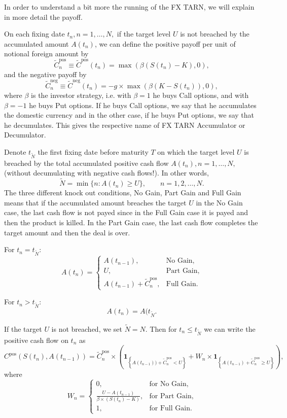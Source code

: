In order to understand a bit more the running of the FX TARN, we will explain in more detail the payoff. 

On each fixing date $t_n, n = 1,\ldots,N,$ if the target level $U$ is not breached by the accumulated amount $A(t_n)$, we can define the positive payoff per unit of notional foreign amount by
$$\tilde{C}^\text{pos}_n \equiv \tilde{C}^\text{pos}(t_n) = \max(\beta(S(t_n)-K),0), $$
and the negative payoff by
$$\tilde{C}_n^\text{neg}\equiv \tilde{C}^\text{neg}(t_n) = -g \times \max(\beta(K-S(t_n)),0),$$
where $\beta$ is the investor strategy, i.e. with $\beta = 1$ he buys Call options, and with $\beta = -1$ he buys Put options. If he buys Call options, we say that he accumulates the domestic currency and in the other case, if he buys Put options, we say that he decumulates. This gives the respective name of FX TARN Accumulator or Decumulator.

Denote $t_{\tilde{N}}$ the first fixing date before maturity $T$ on which the target level $U$ is breached by the total accumulated positive cash flow $A(t_n), n = 1,\ldots,N,$ (without decumulating with negative cash flows!). In other words,
\[\tilde{N}=\min\{n: A(t_n)\geq U\},\qquad n = 1,2,\ldots,N.\]
The three different knock out conditions, No Gain, Part Gain and Full Gain means that if the accumulated amount breaches the target $U$ in the No Gain case, the last cash flow is not payed since in the Full Gain case it is payed and then the product is killed. In the Part Gain case, the last cash flow completes the target amount and then the deal is over.

For $t_n = t_{\tilde{N}}$:
$$A(t_n) = \begin{cases}
A(t_{n-1}), & \text{No Gain,}\\
U, &\text{Part Gain,}\\
A(t_{n-1}) + \tilde{C}_n^\text{pos},&\text{Full Gain.}
\end{cases}$$

For $t_n>t_{\tilde{N}}$:
$$A(t_n) = A(t_{\tilde{N}}.$$

If the target $U$ is not breached, we set $\tilde{N} = N$. Then for $t_n \leq t_{\tilde{N}}$ we can write the positive cash flow on $t_n$ as
\begin{equation}\label{eq:TARN:gain}
C^\text{pos}(S(t_n),A(t_{n-1})) = \tilde{C}^\text{pos}_n\times \left(\mathbf{1}_{\left\{A(t_{n-1}))+\tilde{C}^\text{pos}_n<U\right\}}+W_n\times\mathbf{1}_{\left\{A(t_{n-1})+\tilde{C}^\text{pos}_n\geq U\right\}}\right),
\end{equation}
where 
\[W_n = \begin{cases}
0, &\text{for No Gain,} \\
\frac{U-A(t_{n-1})}{\beta\times(S(t_n)-K)}, & \text{for Part Gain,}\\
1, &\text{for Full Gain.}
\end{cases}\]

